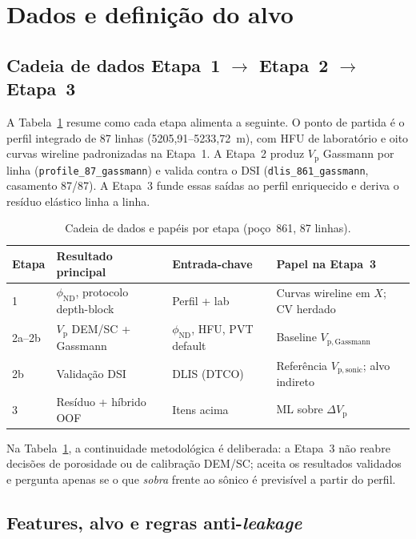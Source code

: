 \documentclass[11pt,a4paper]{article}
\numberwithin{equation}{section}
\newcommand{\Vp}{\ensuremath{V_{\mathrm{p}}}}
\newcommand{\phiND}{\ensuremath{\phi_{\mathrm{ND}}}}
\begin{document}
\section{Dados e definição do alvo}
\label{sec:dados}

\subsection{Cadeia de dados Etapa~1 $\rightarrow$ Etapa~2 $\rightarrow$ Etapa~3}

A Tabela~\ref{tab:chain} resume como cada etapa alimenta a seguinte.
O ponto de partida é o perfil integrado de 87 linhas (5205,91--5233,72~m),
com HFU de laboratório e oito curvas wireline padronizadas na Etapa~1.
A Etapa~2 produz \Vp{} Gassmann por linha (\texttt{profile\_87\_gassmann}) e
valida contra o DSI (\texttt{dlis\_861\_gassmann}, casamento 87/87).
A Etapa~3 funde essas saídas ao perfil enriquecido e deriva o resíduo
elástico linha a linha.

\begin{table}[H]
  \centering
  \caption{Cadeia de dados e papéis por etapa (poço~861, 87 linhas).}
  \label{tab:chain}
  \begin{tabular}{p{2.2cm}p{3.8cm}p{4.2cm}p{3.8cm}}
    \toprule
    Etapa & Resultado principal & Entrada-chave & Papel na Etapa~3 \\
    \midrule
    1 & \phiND{}, protocolo depth-block & Perfil + lab & Curvas wireline em $X$; CV herdado \\
    2a--2b & \Vp{} DEM/SC + Gassmann & \phiND{}, HFU, PVT default & Baseline $V_{\mathrm{p,Gassmann}}$ \\
    2b & Validação DSI & DLIS (DTCO) & Referência $V_{\mathrm{p,sonic}}$; alvo indireto \\
    3 & Resíduo + híbrido OOF & Itens acima & ML sobre $\Delta V_{\mathrm{p}}$ \\
    \bottomrule
  \end{tabular}
\end{table}

Na Tabela~\ref{tab:chain}, a continuidade metodológica é deliberada: a
Etapa~3 não reabre decisões de porosidade ou de calibração DEM/SC;
aceita os resultados validados e pergunta apenas se o que \emph{sobra} frente ao
sônico é previsível a partir do perfil.

\subsection{Features, alvo e regras anti-\emph{leakage}}
\end{document}
